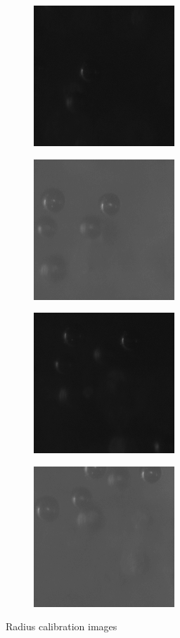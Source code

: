 			\begin{figure}
				\begin{subfigure}[b]{.55\textwidth}
					\centering
					\includegraphics[scale=1]{images/rad_calib_1.png}
					\caption{}
				\end{subfigure}
				\begin{subfigure}[b]{.55\textwidth}
					\centering
					\includegraphics[scale=1]{images/rad_calib_2.png}
					\caption{}
				\end{subfigure}
				\begin{subfigure}[b]{.55\textwidth}
					\centering
					\includegraphics[scale=1]{images/rad_calib_3.png}
					\caption{}
				\end{subfigure}
				\begin{subfigure}[b]{.55\textwidth}
					\centering
					\includegraphics[scale=1]{images/rad_calib_4.png}
					\caption{}
				\end{subfigure}
				
				\caption{Radius calibration images}
				\label{fig:radius_calibration_setup_result}
			\end{figure}
